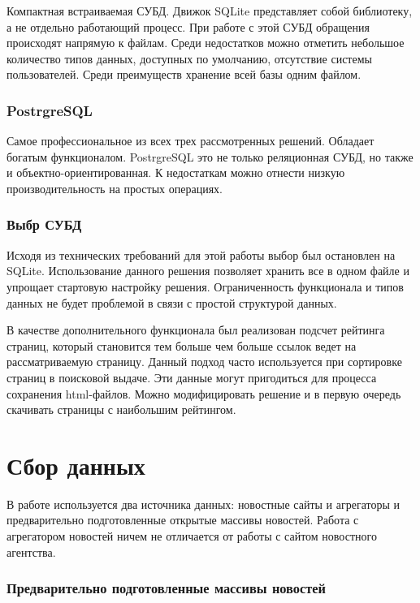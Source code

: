 Компактная встраиваемая СУБД. Движок SQLite представляет собой библиотеку, а не отдельно работающий процесс. При работе с этой СУБД обращения происходят напрямую к файлам. Среди недостатков можно отметить небольшое количество типов данных, доступных по умолчанию, отсутствие системы пользователей. Среди преимуществ хранение всей базы одним файлом.

\subsubsection{PostrgreSQL}

Самое профессиональное из всех трех рассмотренных решений. Обладает богатым функционалом. PostrgreSQL это не только реляционная СУБД, но также и объектно-ориентированная. К недостаткам можно отнести низкую производительность на простых операциях.

\subsubsection{Выбр СУБД}

Исходя из технических требований для этой работы выбор был остановлен на SQLite. Использование данного решения позволяет хранить все в одном файле и упрощает стартовую настройку решения. Ограниченность функционала и типов данных не будет проблемой в связи с простой структурой данных.

В качестве дополнительного функционала был реализован подсчет рейтинга страниц, который становится тем больше чем больше ссылок ведет на рассматриваемую страницу. Данный подход часто используется при сортировке страниц в поисковой выдаче. Эти данные могут пригодиться для процесса сохранения html-файлов. Можно модифицировать решение и в первую очередь скачивать страницы с наибольшим рейтингом.

\section{Сбор данных}

В работе используется два источника данных: новостные сайты и агрегаторы и предварительно подготовленные открытые массивы новостей. Работа с агрегатором новостей ничем не отличается от работы с сайтом новостного агентства.

\subsubsection{Предварительно подготовленные массивы новостей}

